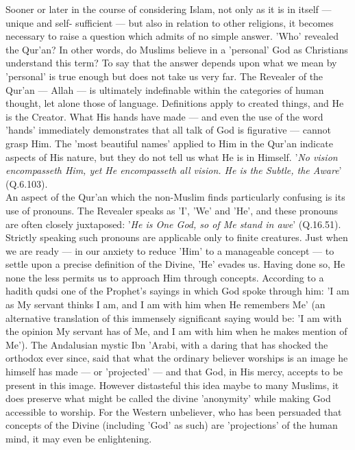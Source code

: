 \documentclass[11pt, b5paper, twoside]{book}
\begin{document}
Sooner or later in the course of considering Islam, not only as it is in itself --- unique and self-
sufficient --- but also in relation to other religions, it becomes necessary to raise a question which 
admits of no simple answer. 'Who' revealed the Qur'an? In other words, do Muslims believe in a 
'personal' God as Christians understand this term? To say that the answer depends upon what we mean 
by 'personal' is true enough but does not take us very far. The Revealer of the Qur'an --- Allah --- is 
ultimately indefinable within the categories of human thought, let alone those of language. 
Definitions apply to created things, and He is the Creator. What His hands have made --- and even the 
use of the word 'hands' immediately demonstrates that all talk of God is figurative --- cannot grasp 
Him. The 'most beautiful names' applied to Him in the Qur'an indicate aspects of His nature, but they 
do not tell us what He is in Himself. '\emph{No vision encompasseth Him, yet He encompasseth all vision. He is the Subtle, the Aware}' (Q.6.103). \\

An aspect of the Qur'an which the non-Muslim finds particularly confusing is its use of pronouns. The 
Revealer speaks as 'I', 'We' and 'He', and these pronouns are often closely juxtaposed: '\emph{He is One 
God, so of Me stand in awe}' (Q.16.51). Strictly speaking such pronouns are applicable only to finite 
creatures. Just when we are ready --- in our anxiety to reduce 'Him' to a manageable concept --- to 
settle upon a precise definition of the Divine, 'He' evades us. Having done so, He none the less 
permits us to approach Him through concepts. According to a hadith qudsi one of the Prophet's sayings 
in which God spoke through him: 'I am as My servant thinks I am, and I am with him when He remembers 
Me' (an alternative translation of this immensely significant saying would be: 'I am with the opinion 
My servant has of Me, and I am with him when he makes mention of Me'). The Andalusian mystic Ibn 
'Arabi, with a daring that has shocked the orthodox ever since, said that what the ordinary believer 
worships is an image he himself has made --- or 'projected' --- and that God, in His mercy, accepts to be 
present in this image. However distasteful this idea maybe to many Muslims, it does preserve what 
might be called the divine 'anonymity' while making God accessible to worship. For the Western 
unbeliever, who has been persuaded that concepts of the Divine (including 'God' as such) are 
'projections' of the human mind, it may even be enlightening. \\
\end{document}
